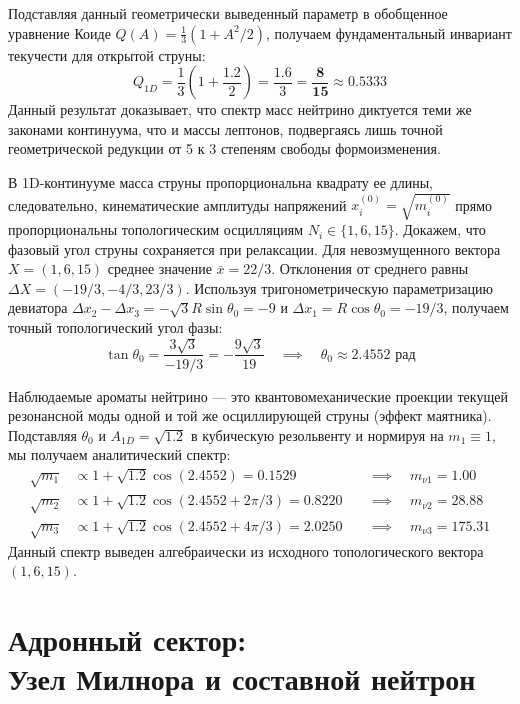 \documentclass[12pt,a4paper]{article}
\begin{document}
	Подставляя данный геометрически выведенный параметр в обобщенное уравнение Коиде $Q(A) = \frac{1}{3}(1 + A^2/2)$, получаем фундаментальный инвариант текучести для открытой струны:
	\begin{equation}
		Q_{1D} = \frac{1}{3} \left( 1 + \frac{1.2}{2} \right) = \frac{1.6}{3} = \mathbf{\frac{8}{15}} \approx 0.5333
	\end{equation}
	Данный результат доказывает, что спектр масс нейтрино диктуется теми же законами континуума, что и массы лептонов, подвергаясь лишь точной геометрической редукции от 5 к 3 степеням свободы формоизменения.
	
	В 1D-континууме масса струны пропорциональна квадрату ее длины, следовательно, кинематические амплитуды напряжений $x_i^{(0)} = \sqrt{m_i^{(0)}}$ прямо пропорциональны топологическим осцилляциям $N_i \in \{1, 6, 15\}$. 
	Докажем, что фазовый угол струны сохраняется при релаксации. Для невозмущенного вектора $X = (1, 6, 15)$ среднее значение $\bar{x} = 22/3$. Отклонения от среднего равны $\Delta X = (-19/3, -4/3, 23/3)$.
	Используя тригонометрическую параметризацию девиатора $\Delta x_2 - \Delta x_3 = -\sqrt{3} R \sin\theta_0 = -9$ и $\Delta x_1 = R \cos\theta_0 = -19/3$, получаем точный топологический угол фазы:
	\begin{equation}
		\tan\theta_0 = \frac{3\sqrt{3}}{-19/3} = -\frac{9\sqrt{3}}{19} \quad \implies \quad \theta_0 \approx 2.4552 \text{ рад}
	\end{equation}
	
	Наблюдаемые ароматы нейтрино — это квантовомеханические проекции текущей резонансной моды одной и той же осциллирующей струны (эффект маятника). Подставляя $\theta_0$ и $A_{1D} = \sqrt{1.2}$ в кубическую резольвенту и нормируя на $m_1 \equiv 1$, мы получаем аналитический спектр:
	\begin{align}
		\sqrt{m_1} &\propto 1 + \sqrt{1.2} \cos(2.4552) = 0.1529 \quad &\implies \quad m_{\nu 1} = \mathbf{1.00} \\
		\sqrt{m_2} &\propto 1 + \sqrt{1.2} \cos(2.4552 + 2\pi/3) = 0.8220 \quad &\implies \quad m_{\nu 2} = \mathbf{28.88} \\
		\sqrt{m_3} &\propto 1 + \sqrt{1.2} \cos(2.4552 + 4\pi/3) = 2.0250 \quad &\implies \quad m_{\nu 3} = \mathbf{175.31}
	\end{align}
	Данный спектр выведен алгебраически из исходного топологического вектора $(1,6,15)$.
	
	\section{Адронный сектор:\\ Узел Милнора и составной нейтрон}
	
\end{document}
